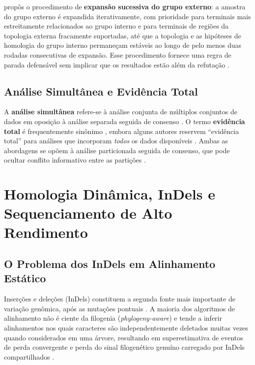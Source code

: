 \textcite{grant2019} propôs o procedimento de \textbf{expansão sucessiva do grupo externo}: a amostra do grupo externo é expandida iterativamente, com prioridade para terminais mais estreitamente relacionados ao grupo interno e para terminais de regiões da topologia externa fracamente suportadas, até que a topologia e as hipóteses de homologia do grupo interno permaneçam estáveis ao longo de pelo menos duas rodadas consecutivas de expansão. Esse procedimento fornece uma regra de parada defensável sem implicar que os resultados estão além da refutação \parencite{grant2019}.

\subsection{Análise Simultânea e Evidência Total}

A \textbf{análise simultânea} refere-se à análise conjunta de múltiplos conjuntos de dados em oposição à análise separada seguida de consenso \parencite{nixon1996}. O termo \textbf{evidência total} é frequentemente sinônimo \parencite{kluge1989}, embora alguns autores reservem ``evidência total'' para análises que incorporam \emph{todos} os dados disponíveis \parencite{kluge1989,nixon1996}. Ambas as abordagens se opõem à análise particionada seguida de consenso, que pode ocultar conflito informativo entre as partições \parencite{grantkluge2003}.

\section{Homologia Dinâmica, InDels e Sequenciamento de Alto Rendimento}
\label{sec:dinamica}

\subsection{O Problema dos InDels em Alinhamento Estático}

Inserções e deleções (InDels) constituem a segunda fonte mais importante de variação genômica, após as mutações pontuais \parencite{redelings2024}. A maioria dos algoritmos de alinhamento não é ciente da filogenia (\textit{phylogeny-aware}) e tende a inferir alinhamentos nos quais caracteres são independentemente deletados muitas vezes quando considerados em uma árvore, resultando em superestimativa de eventos de perda convergente e perda do sinal filogenético genuíno carregado por InDels compartilhados \parencite{redelings2024}.

